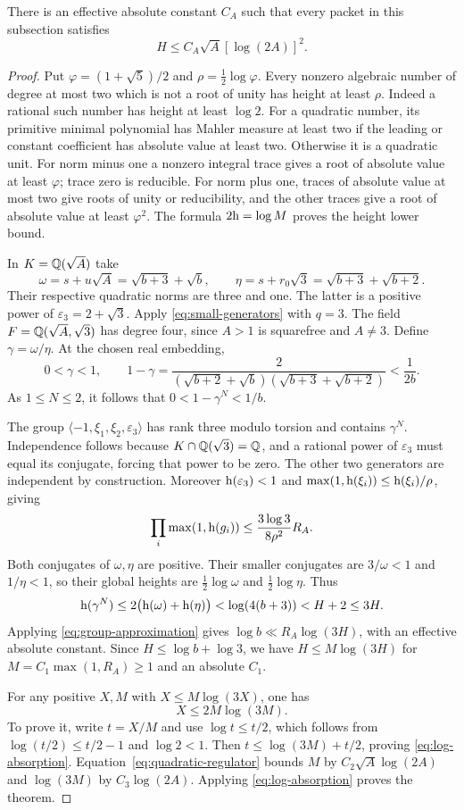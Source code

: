 \begin{theorem}\label{thm:fixed-norm-A}
There is an effective absolute constant $C_A$ such that every packet in
this subsection satisfies
\[
 H\le C_A\sqrt A[\log(2A)]^2.
\]
\end{theorem}
\begin{proof}
Put $\varphi=(1+\sqrt5)/2$ and $\rho=\tfrac12\log\varphi$.
Every nonzero algebraic number of degree at most two which is not a root
of unity has height at least $\rho$. Indeed a rational such number has
height at least $\log2$. For a quadratic number, its primitive minimal
polynomial has Mahler measure at least two if the leading or constant
coefficient has absolute value at least two. Otherwise it is a quadratic
unit. For norm minus one a nonzero integral trace gives a root of absolute
value at least $\varphi$; trace zero is reducible. For norm plus one,
traces of absolute value at most two give roots of unity or reducibility,
and the other traces give a root of absolute value at least $\varphi^2$.
The formula $2\mathrm h=\log M$ proves the height lower bound.

In $K=\mathbb Q(\sqrt A)$ take
\[
 \omega=s+u\sqrt A=\sqrt{b+3}+\sqrt b,
 \qquad \eta=s+r_0\sqrt3=\sqrt{b+3}+\sqrt{b+2}.
\]
Their respective quadratic norms are three and one. The latter is a
positive power of $\varepsilon_3=2+\sqrt3$. Apply
\eqref{eq:small-generators} with $q=3$. The field
$F=\mathbb Q(\sqrt A,\sqrt3)$ has degree four, since $A>1$ is squarefree and
$A\ne3$. Define $\gamma=\omega/\eta$. At the chosen real embedding,
\[
 0<\gamma<1,\qquad
 1-\gamma=
 \frac{2}{(\sqrt{b+2}+\sqrt b)(\sqrt{b+3}+\sqrt{b+2})}
 <\frac1{2b}.
\]
As $1\le N\le2$, it follows that $0<1-\gamma^N<1/b$.

The group $\langle-1,\xi_1,\xi_2,\varepsilon_3\rangle$ has rank three
modulo torsion and contains $\gamma^N$. Independence follows because
$K\cap\mathbb Q(\sqrt3)=\mathbb Q$, and a rational power of $\varepsilon_3$ must equal
its conjugate, forcing that power to be zero. The other two generators
are independent by construction. Moreover $\mathrm h(\varepsilon_3)<1$ and
$\max(1,\mathrm h(\xi_i))\le\mathrm h(\xi_i)/\rho$, giving
\[
 \prod_i\max(1,\mathrm h(g_i))\le\frac{3\log3}{8\rho^2}R_A.
\]
Both conjugates of $\omega,\eta$ are positive. Their smaller conjugates
are $3/\omega<1$ and $1/\eta<1$, so their global heights are
$\tfrac12\log\omega$ and $\tfrac12\log\eta$. Thus
\[
 \mathrm h(\gamma^N)\le2\bigl(\mathrm h(\omega)+\mathrm h(\eta)\bigr)
 <\log(4(b+3))<H+2\le3H.
\]
Applying \eqref{eq:group-approximation} gives
$\log b\ll R_A\log(3H)$, with an effective absolute constant.
Since $H\le\log b+\log3$, we have
$H\le M\log(3H)$ for $M=C_1\max(1,R_A)\ge1$ and an absolute $C_1$.

For any positive $X,M$ with $X\le M\log(3X)$, one has
\begin{equation}\label{eq:log-absorption}
 X\le2M\log(3M).
\end{equation}
To prove it, write $t=X/M$ and use
$\log t\le t/2$, which follows from
$\log(t/2)\le t/2-1$ and $\log2<1$.
Then $t\le\log(3M)+t/2$, proving \eqref{eq:log-absorption}.
Equation~\eqref{eq:quadratic-regulator} bounds $M$ by
$C_2\sqrt A\log(2A)$ and $\log(3M)$ by $C_3\log(2A)$.
Applying \eqref{eq:log-absorption} proves the theorem.
\end{proof}


